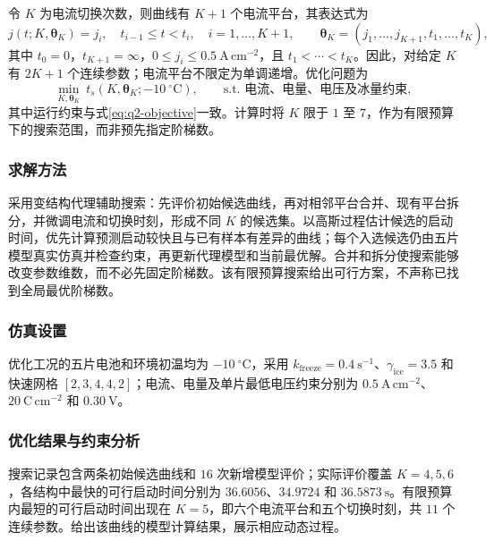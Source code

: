 \documentclass{gmcmthesis}
\begin{document}
令 $K$ 为电流切换次数，则曲线有 $K+1$ 个电流平台，其表达式为
\begin{equation}
  j(t;K,\bm{\theta}_K)=j_i,\quad t_{i-1}\le t<t_i,
  \quad i=1,\ldots,K+1,
  \qquad
  \bm{\theta}_K=(j_1,\ldots,j_{K+1},t_1,\ldots,t_K),
  \label{eq:q2-step-current}
\end{equation}
其中 $t_0=0$，$t_{K+1}=\infty$，$0\le j_i\le0.5~\mathrm{A\,cm^{-2}}$，且 $t_1<\cdots<t_K$。因此，对给定 $K$ 有 $2K+1$ 个连续参数；电流平台不限定为单调递增。优化问题为
\begin{equation}
  \min_{K,\bm{\theta}_K}\ t_s(K,\bm{\theta}_K;-10~^{\circ}\mathrm{C}),
  \qquad
  \text{s.t. 电流、电量、电压及冰量约束},
  \label{eq:q2-step-decode}
\end{equation}
其中运行约束与式\eqref{eq:q2-objective}一致。计算时将 $K$ 限于 $1$ 至 $7$，作为有限预算下的搜索范围，而非预先指定阶梯数。

\subsubsection{求解方法}
\label{subsec:q2-step-method}

采用变结构代理辅助搜索：先评价初始候选曲线，再对相邻平台合并、现有平台拆分，并微调电流和切换时刻，形成不同 $K$ 的候选集。以高斯过程估计候选的启动时间，优先计算预测启动较快且与已有样本有差异的曲线；每个入选候选仍由五片模型真实仿真并检查约束，再更新代理模型和当前最优解。合并和拆分使搜索能够改变参数维数，而不必先固定阶梯数。该有限预算搜索给出可行方案，不声称已找到全局最优阶梯数。

\subsubsection{仿真设置}
\label{subsec:q2-step-settings}

优化工况的五片电池和环境初温均为 $-10~^{\circ}\mathrm{C}$，采用 $k_{\mathrm{freeze}}=0.4~\mathrm{s^{-1}}$、$\gamma_{\mathrm{ice}}=3.5$ 和快速网格 $[2,3,4,4,2]$；电流、电量及单片最低电压约束分别为 $0.5~\mathrm{A\,cm^{-2}}$、$20~\mathrm{C\,cm^{-2}}$ 和 $0.30~\mathrm{V}$。

\subsubsection{优化结果与约束分析}
\label{subsec:q2-step-results}

搜索记录包含两条初始候选曲线和 $16$ 次新增模型评价；实际评价覆盖 $K=4,5,6$，各结构中最快的可行启动时间分别为 $36.6056$、$34.9724$ 和 $36.5873~\mathrm{s}$。有限预算内最短的可行启动时间出现在 $K=5$，即六个电流平台和五个切换时刻，共 $11$ 个连续参数。给出该曲线的模型计算结果，展示相应动态过程。
\end{document}

